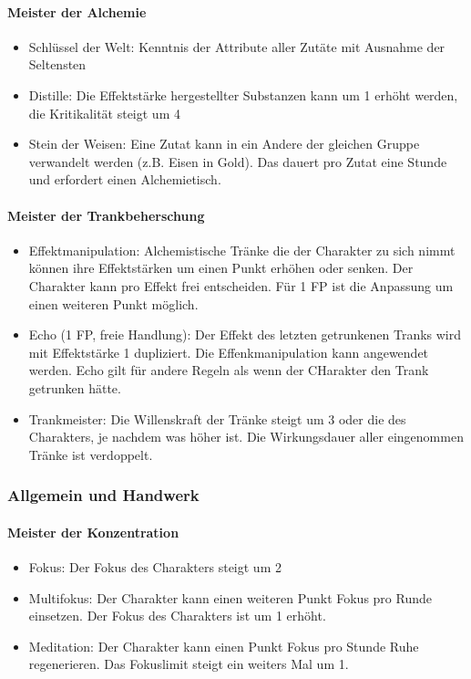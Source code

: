 \documentclass{article}
\begin{document}
\paragraph{Meister der Alchemie}

\begin{itemize}
\item Schlüssel der Welt: Kenntnis der Attribute aller Zutäte mit Ausnahme der Seltensten
\item Distille: Die Effektstärke hergestellter Substanzen kann um 1 erhöht werden, die Kritikalität steigt um 4
\item Stein der Weisen: Eine Zutat kann in ein Andere der gleichen Gruppe verwandelt werden (z.B. Eisen in Gold). Das dauert pro Zutat eine Stunde und erfordert einen Alchemietisch.
\end{itemize}

\paragraph{Meister der Trankbeherschung}

\begin{itemize}
\item Effektmanipulation: Alchemistische Tränke die der Charakter zu sich nimmt können ihre Effektstärken um einen Punkt erhöhen oder senken. Der Charakter kann pro Effekt frei entscheiden. Für 1 FP ist die Anpassung um einen weiteren Punkt möglich.
\item Echo (1 FP, freie Handlung): Der Effekt des letzten getrunkenen Tranks wird mit Effektstärke 1 dupliziert. Die Effenkmanipulation kann angewendet werden. Echo gilt für andere Regeln als wenn der CHarakter den Trank getrunken hätte.
\item Trankmeister: Die Willenskraft der Tränke steigt um 3 oder die des Charakters, je nachdem was höher ist. Die Wirkungsdauer aller eingenommen Tränke ist verdoppelt.
\end{itemize}

\subsubsection{Allgemein und Handwerk}

\paragraph{Meister der Konzentration}

\begin{itemize}
\item Fokus: Der Fokus des Charakters steigt um 2
\item Multifokus: Der Charakter kann einen weiteren Punkt Fokus pro Runde einsetzen. Der Fokus des Charakters ist um 1 erhöht.
\item Meditation: Der Charakter kann einen Punkt Fokus pro Stunde Ruhe regenerieren. Das Fokuslimit steigt ein weiters Mal um 1.
\end{itemize}
\end{document}
